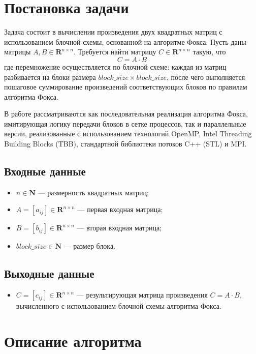 \documentclass[12pt,a4paper]{extarticle}
\begin{document}
\newpage
\section{Постановка задачи}

Задача состоит в вычислении произведения двух квадратных матриц с использованием блочной схемы, основанной на алгоритме Фокса. Пусть даны матрицы \( A, B \in \mathbf{R}^{n \times n} \). Требуется найти матрицу \( C \in \mathbf{R}^{n \times n} \) такую, что
\[
C = A \cdot B
\]
где перемножение осуществляется по блочной схеме: каждая из матриц разбивается на блоки размера \( block \_ size \times block \_ size \), после чего выполняется пошаговое суммирование произведений соответствующих блоков по правилам алгоритма Фокса.

В работе рассматриваются как последовательная реализация алгоритма Фокса, имитирующая логику передачи блоков в сетке процессов, так и параллельные версии, реализованные с использованием технологий OpenMP, Intel Threading Building Blocks (TBB), стандартной библиотеки потоков C++ (STL) и MPI.

\subsection{Входные данные}

\begin{itemize}
	\item \( n \in \mathbf{N} \) — размерность квадратных матриц;
	\item \( A = [a_{ij}] \in \mathbf{R}^{n \times n} \) — первая входная матрица;
	\item \( B = [b_{ij}] \in \mathbf{R}^{n \times n} \) — вторая входная матрица;
	\item \( block \_ size \in \mathbf{N} \) — размер блока.
\end{itemize}

\subsection{Выходные данные}

\begin{itemize}
	\item \( C = [c_{ij}] \in \mathbf{R}^{n \times n} \) — результирующая матрица произведения \( C = A \cdot B \), вычисленного с использованием блочной схемы алгоритма Фокса.
\end{itemize}

\newpage
\section{Описание алгоритма}
\end{document}
